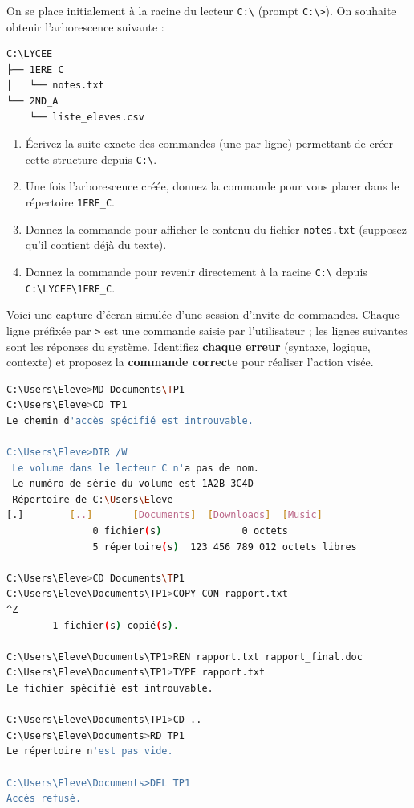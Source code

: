 \documentclass[11pt]{article}
\begin{document}
\begin{exercice}
On se place initialement à la racine du lecteur \texttt{C:\textbackslash} (prompt \texttt{C:\textbackslash>}).
On souhaite obtenir l'arborescence suivante :
\begin{lstlisting}[language=text]
C:\LYCEE
├── 1ERE_C
│   └── notes.txt
└── 2ND_A
    └── liste_eleves.csv
\end{lstlisting}
\begin{enumerate}
    \item Écrivez la suite exacte des commandes (une par ligne) permettant de créer cette structure depuis \texttt{C:\textbackslash}.
    \item Une fois l'arborescence créée, donnez la commande pour vous placer dans le répertoire \texttt{1ERE\_C}.
    \item Donnez la commande pour afficher le contenu du fichier \texttt{notes.txt} (supposez qu'il contient déjà du texte).
    \item Donnez la commande pour revenir directement à la racine \texttt{C:\textbackslash} depuis \texttt{C:\textbackslash LYCEE\textbackslash 1ERE\_C}.
\end{enumerate}
\end{exercice}

\begin{exercice}
Voici une capture d'écran simulée d'une session d'invite de commandes. Chaque ligne préfixée par \texttt{>} est une commande saisie par l'utilisateur ; les lignes suivantes sont les réponses du système. Identifiez \textbf{chaque erreur} (syntaxe, logique, contexte) et proposez la \textbf{commande correcte} pour réaliser l'action visée.

\begin{lstlisting}[language=bash]
C:\Users\Eleve>MD Documents\TP1
C:\Users\Eleve>CD TP1
Le chemin d'accès spécifié est introuvable.

C:\Users\Eleve>DIR /W
 Le volume dans le lecteur C n'a pas de nom.
 Le numéro de série du volume est 1A2B-3C4D
 Répertoire de C:\Users\Eleve
[.]        [..]       [Documents]  [Downloads]  [Music]
               0 fichier(s)              0 octets
               5 répertoire(s)  123 456 789 012 octets libres

C:\Users\Eleve>CD Documents\TP1
C:\Users\Eleve\Documents\TP1>COPY CON rapport.txt
^Z
        1 fichier(s) copié(s).

C:\Users\Eleve\Documents\TP1>REN rapport.txt rapport_final.doc
C:\Users\Eleve\Documents\TP1>TYPE rapport.txt
Le fichier spécifié est introuvable.

C:\Users\Eleve\Documents\TP1>CD ..
C:\Users\Eleve\Documents>RD TP1
Le répertoire n'est pas vide.

C:\Users\Eleve\Documents>DEL TP1
Accès refusé.
\end{lstlisting}
\end{exercice}
\end{document}
